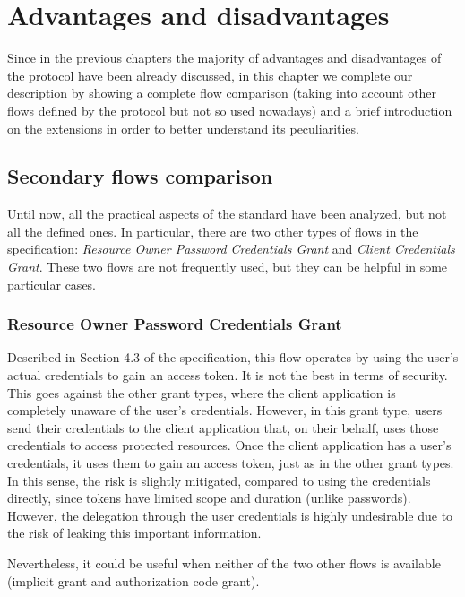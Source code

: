 
\chapter{Advantages and disadvantages}
Since in the previous chapters the majority of advantages and disadvantages of the protocol have been already discussed, in this chapter we complete our \textit{\oauth} description by showing a complete flow comparison (taking into account other flows defined by the protocol but not so used nowadays) and a brief introduction on the extensions in order to better understand its peculiarities. 


\section{Secondary flows comparison}
Until now, all the practical aspects of the standard  \cite{RFC6749} have been analyzed, but not all the defined ones. In particular, there are two other types of flows in the specification: \textit{Resource Owner Password Credentials Grant} and \textit{Client Credentials Grant}. These two flows are not frequently used, but they can be helpful in some particular cases.

\subsection{Resource Owner Password Credentials Grant}
Described in Section 4.3 of the specification, this flow operates by using the user's actual credentials to gain an access token. It is not the best in terms of security. This goes against the other grant types, where the client application is completely unaware of the user's credentials. However, in this grant type, users send their credentials to the client application that, on their behalf, uses those credentials to access protected resources.
Once the client application has a user's credentials, it uses them to gain an access token, just as in the other grant types. In this sense, the risk is slightly mitigated, compared to using the credentials directly, since tokens have limited scope and duration (unlike passwords). However, the delegation through the user credentials is highly undesirable due to the risk of leaking this important information.

Nevertheless, it could be useful when neither of the two other flows is available (implicit grant and authorization code grant).

